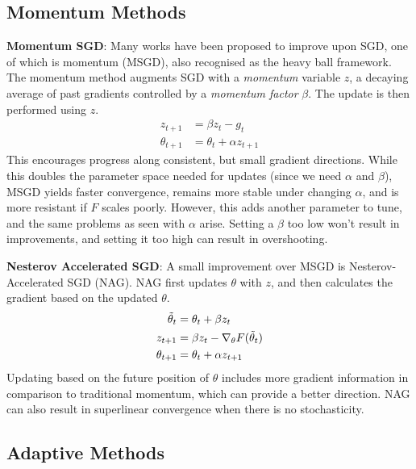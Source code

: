 \subsection{Momentum Methods}
\textbf{Momentum SGD}: Many works have been proposed to improve upon SGD, one of which is momentum (MSGD), also recognised as the heavy ball framework. The momentum method augments SGD with a \textit{momentum} variable $z$, a decaying average of past gradients controlled by a \textit{momentum factor} $\beta$. The update is then performed using $z$. 
\begin{align}
    z_{t+1} &= \beta z_{t} - g_t \\
    \theta_{t+1} &= \theta_t + \alpha z_{t+1}
\end{align}
This encourages progress along consistent, but small gradient directions. While this doubles the parameter space needed for updates (since we need $\alpha$ and $\beta$), MSGD yields faster convergence, remains more stable under changing $\alpha$, and is more resistant if $F$ scales poorly. However, this adds another parameter to tune, and the same problems as seen with $\alpha$ arise. Setting a $\beta$ too low won't result in improvements, and setting it too high can result in overshooting.

\textbf{Nesterov Accelerated SGD}: A small improvement over MSGD is Nesterov-Accelerated SGD (NAG). NAG first updates $\theta$ with $z$, and then calculates the gradient based on the updated $\theta$.
\begin{align}
    \Tilde{\theta}_{t} &= \theta_{t} + \beta z_{t} \\
    z_{t+1} &= \beta z_t - \nabla_{\theta} F(\Tilde{\theta}_{t}) \\
    \theta_{t+1} &= \theta_{t} + \alpha z_{t+1}
\end{align}
Updating based on the future position of $\theta$ includes more gradient information in comparison to traditional momentum, which can provide a better direction. NAG can also result in superlinear convergence when there is no stochasticity.

\subsection{Adaptive Methods}

